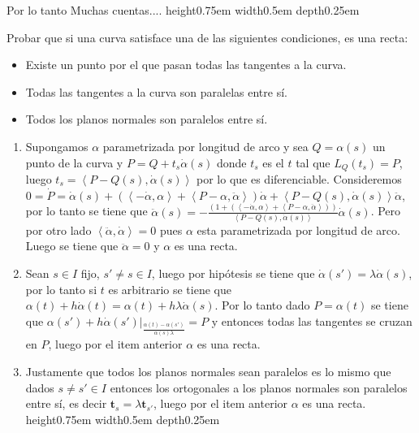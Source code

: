 \documentclass[11pt]{article}
\newcommand\ip[1]{\left\langle#1\right\rangle}
\renewcommand\tt{\mathbf{t}}
\newenvironment{proof}[1][Demostraci\'on]{\begin{trivlist}
		\item[\hskip \labelsep {\bfseries #1}]}{\end{trivlist}}
\newcommand{\qed}{\nobreak \ifvmode \relax \else
	\ifdim\lastskip<1.5em \hskip-\lastskip
	\hskip1.5em plus0em minus0.5em \fi \nobreak
	\vrule height0.75em width0.5em depth0.25em\fi}
\begin{document}
\begin{enumerate}
\begin{proof}
\begin{enumerate}
			Por lo tanto Muchas cuentas.... \qed
			
		\end{enumerate}
		
	\end{proof}
	
	\item Probar que si una curva satisface una de las siguientes condiciones, es una recta:
	\begin{itemize}
		\item Existe un punto por el que pasan todas las tangentes a la curva.
		\item Todas las tangentes a la curva son paralelas entre s\'i.
		\item Todos los planos normales son paralelos entre s\'i.
	\end{itemize}
	
	\label{Ejercicio 2}
	
	\begin{proof}
		
		\begin{enumerate}
			
			\item Supongamos $\alpha$ parametrizada por longitud de arco y sea $Q = \alpha(s)$ un punto de la curva y $P = Q+ t_s\dot{\alpha}(s)$ donde $t_s$ es el $t$ tal que $L_Q(t_s) = P$, luego $t_s = \ip{P - Q(s) , \dot{\alpha}(s)}$ por lo que es diferenciable. Consideremos $0 = \dot{P} = \dot{\alpha}(s) + (\ip{-\dot{\alpha}, \alpha} + \ip{P-\alpha , \ddot{\alpha}})\dot{\alpha} + \ip{P - Q(s) , \dot{\alpha}(s)} \ddot{\alpha}$, por lo tanto se tiene que $\ddot{\alpha}(s) = -\frac{(1+(\ip{-\dot{\alpha}, \alpha} + \ip{P-\alpha , \ddot{\alpha}}))}{\ip{P - Q(s) , \dot{\alpha}(s)}} \dot{\alpha}(s)$. Pero por otro lado $\ip{\ddot{\alpha} , \dot{\alpha}} = 0$ pues $\alpha$ esta parametrizada por longitud de arco. Luego se tiene que $\ddot{\alpha} = 0$ y $\alpha$ es una recta.
			
			\item Sean $s \in I$ fijo, $s'\neq s \in I$, luego por hip\'otesis se tiene que $\dot{\alpha}(s') = \lambda \dot{\alpha}(s)$, por lo tanto si $t$ es arbitrario se tiene que $\alpha(t) + h\dot{\alpha}(t) = \alpha(t) + h\lambda \dot{\alpha}(s)$. Por lo tanto dado $P = \alpha(t)$ se tiene que $\alpha(s') + h \dot{\alpha}(s') |_{\frac{\alpha(t) - \alpha(s')}{\dot{\alpha}(s)\lambda}} = P$ y entonces todas las tangentes se cruzan en $P$, luego por el item anterior $\alpha$ es una recta.
			
			\item Justamente que todos los planos normales sean paralelos es lo mismo que dados $s \neq s' \in I$ entonces los ortogonales a los planos normales son paralelos entre s\'i, es decir $\tt_s = \lambda \tt_{s'}$, luego por el item anterior $\alpha$ es una recta. \qed
			

\end{enumerate}
\end{proof}
\end{enumerate}
\end{document}
